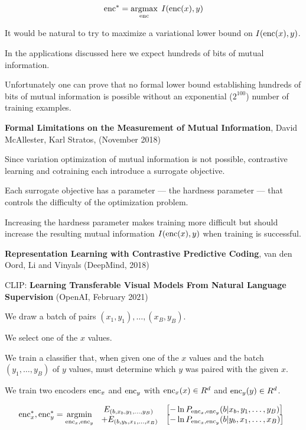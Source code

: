 {$$\mathrm{enc}^* = \operatorname*{argmax}_{\mathrm{enc}}\; I(\mathrm{enc}(x),y)$$

\vfill
{\huge
It would be natural to try to maximize a variational lower bound on $I(\mathrm{enc}(x),y)$.

\vfill
In the applications discussed here we expect hundreds of bits of mutual information.

\vfill
Unfortunately one can prove that no formal lower bound
establishing hundreds of bits of mutual information  is possible without an exponential ($2^{100}$) number of training examples.

\vfill
{\bf Formal Limitations on the Measurement of Mutual Information},
David McAllester, Karl Stratos, (November 2018)
}


Since variation optimization of mutual information is not possible, contrastive learning and cotraining each introduce a surrogate objective.

\vfill
Each surrogate objective has a parameter --- the hardness parameter --- that controls the difficulty of the optimization problem.

\vfill
Increasing the hardness parameter makes training more difficult but should increase the resulting mutual information $I(\mathrm{enc}(x),y)$
when training is successful.


{\bf Representation Learning with Contrastive Predictive Coding}, van den Oord, Li and Vinyals (DeepMind, 2018)

\vfill
CLIP: {\bf Learning Transferable Visual Models From Natural Language Supervision} (OpenAI, February 2021)


We draw a batch of pairs $(x_1,y_1),\ldots,(x_B,y_B)$.

\vfill
We select one of the $x$ values.

\vfill
We train a classifier that, when given one of the $x$ values and the batch $(y_1,\ldots,y_B)$ of $y$ values, must determine which $y$ was paired with the given $x$.



We train two encoders $\mathrm{enc}_x$ and $\mathrm{enc}_y$ with $\mathrm{enc}_x(x) \in R^d$ and $\mathrm{enc}_y(y) \in R^d$.

{\huge
$$\mathrm{enc}_x^*,\mathrm{enc}_y^* = \operatorname*{argmin}_{\mathrm{enc}_x,\mathrm{enc}_y}\; \begin{array}{cl} E_{(b,x_b,y_1,\ldots,y_B)}\;&\left[-\ln P_{\mathrm{enc}_x,\mathrm{enc}_y}(b|x_b,y_1,\ldots,y_B)\right] \\
+  E_{(b,y_b,x_1,\ldots,x_B)}&\left[-\ln P_{\mathrm{enc}_x,\mathrm{enc}_y}(b|y_b,x_1,\ldots,x_B)\right]\end{array}$$

}}
